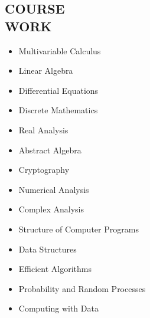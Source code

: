 \documentclass[margin]{res}
\begin{document}
\begin{resume}
\section{COURSE \\ WORK}             
               \begin{multicols}{2}
	       \begin{itemize}\itemsep -2pt
		\item Multivariable Calculus\\
 		\item Linear Algebra 
		\item Differential Equations\\
		\item Discrete Mathematics\\
                \item Real Analysis\\
                \item Abstract Algebra\\
		\item Cryptography\\
		\item Numerical Analysis\\
                \item Complex Analysis\\
                \item Structure of Computer Programs\\
		\item Data Structures\\
                \item Efficient Algorithms\\
		\item Probability and Random Processes\\
                \item Computing with Data\\
		\end{itemize}
	       \end{multicols}

 

\end{resume}
\end{document}
